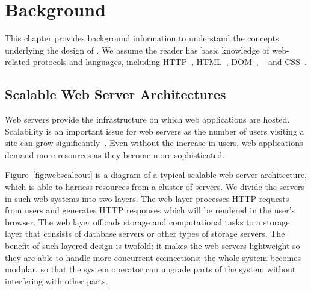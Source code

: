 \chapter{Background}

This chapter provides background information to understand the concepts underlying the
design of \cbtwo.
We assume the reader has basic knowledge of web-related protocols and languages,
including HTTP~\cite{rfc7231}, HTML~\cite{hickson2012html}, 
DOM~\cite{2000Document}, \js~\cite{ecmascript2011ecmascript} and CSS~\cite{css21}.

\webscaleoutfig{}

\section{Scalable Web Server Architectures}
\label{sec:websys}

Web servers provide the infrastructure on which web applications 
are hosted.
Scalability is an important issue for web servers as the number of users
visiting a site can grow significantly~\cite{berners1998world}.
Even without the increase in users,
web applications demand more resources as they become more sophisticated.

Figure~\ref{fig:webscaleout} is a diagram of a typical scalable web server architecture,
which is able to harness resources from a cluster of servers.
We divide the servers in such web systems into two layers.
The web layer processes HTTP requests from users
and generates HTTP responses which will be rendered in the user's browser.
The web layer offloads storage and computational tasks to a storage layer
that consists of database servers or other types of storage servers.
The benefit of such layered design is twofold:
it makes the web servers lightweight so they are able to handle more concurrent 
connections;
the whole system becomes modular,
so that the system operator can upgrade parts of the system without interfering
with other parts.

